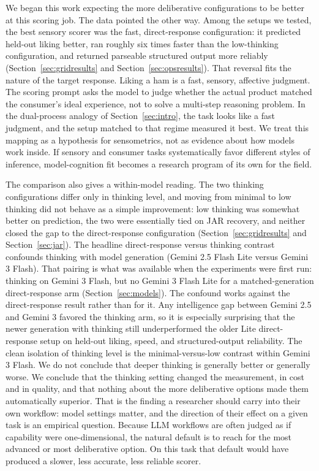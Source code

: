\documentclass[11pt]{article}
\begin{document}
We began this work expecting the more deliberative configurations to be better
at this scoring job. The data pointed the other way. Among the setups we
tested, the best sensory scorer was the fast, direct-response configuration:
it predicted held-out liking better, ran roughly six times faster than the
low-thinking configuration, and returned parseable structured output more
reliably (Section~\ref{sec:gridresults} and Section~\ref{sec:opsresults}).
That reversal fits the nature of the target response. Liking a ham is a fast,
sensory, affective judgment. The scoring prompt asks the model to judge
whether the actual product matched the consumer's ideal experience, not to
solve a multi-step reasoning problem. In the dual-process analogy of
Section~\ref{sec:intro}, the task looks like a fast judgment, and the setup
matched to that regime measured it best. We treat this mapping as a hypothesis
for sensometrics, not as evidence about how models work inside. If sensory and
consumer tasks systematically favor different styles of inference,
model-cognition fit becomes a research program of its own for the field.

The comparison also gives a within-model reading. The two thinking
configurations differ only in thinking level, and moving from minimal to low
thinking did not behave as a simple improvement: low thinking was somewhat
better on prediction, the two were essentially tied on JAR recovery, and
neither closed the gap to the direct-response configuration
(Section~\ref{sec:gridresults} and Section~\ref{sec:jar}). The headline direct-response versus thinking contrast confounds thinking with
model generation (Gemini 2.5 Flash Lite versus Gemini 3 Flash). That pairing
is what was available when the experiments were first run: thinking on Gemini
3 Flash, but no Gemini 3 Flash Lite for a matched-generation direct-response
arm (Section~\ref{sec:models}). The confound works against the
direct-response result rather than for it. Any intelligence gap between Gemini
2.5 and Gemini 3 favored the thinking arm, so it is especially surprising that
the newer generation with thinking still underperformed the older Lite
direct-response setup on held-out liking, speed, and structured-output
reliability. The clean isolation of thinking level is the minimal-versus-low
contrast within Gemini 3 Flash. We do not conclude that deeper thinking is generally better or
generally worse. We conclude that the thinking setting changed the
measurement, in cost and in quality, and that nothing about the more
deliberative options made them automatically superior. That is the finding a
researcher should carry into their own workflow: model settings matter, and
the direction of their effect on a given task is an empirical question.
Because LLM workflows are often judged as if capability were one-dimensional,
the natural default is to reach for the most advanced or most deliberative
option. On this task that default would have produced a slower, less accurate,
less reliable scorer.
\end{document}
